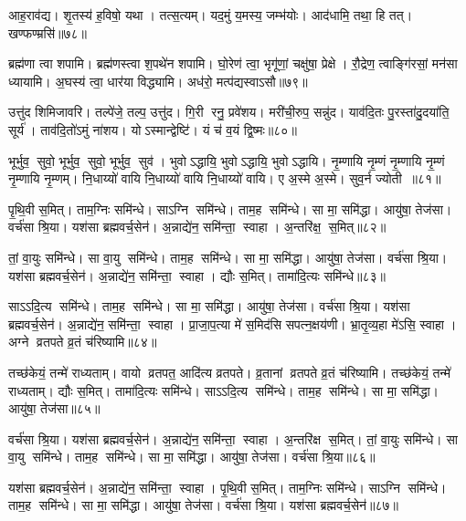 आह॒राव॑द्य। शृ॒तस्य॑ ह॒विषो॒ यथा। तत्स॒त्यम्। यद॒मुं य॒मस्य॒ जम्भ॑योः। आद॑धामि॒ तथा॒ हि तत्। खण्फण्म्रसि॑॥७८॥
\anuvakamend


ब्रह्म॑णा त्वा शपामि। ब्रह्म॑णस्त्वा श॒पथे॑न शपामि। घो॒रेण॑ त्वा॒ भृगू॑णां॒ चक्षु॑षा॒ प्रेक्षे। रौ॒द्रेण॒ त्वाङ्गि॑रसां॒ मन॑सा ध्यायामि। अ॒घस्य॑ त्वा॒ धार॑या विद्ध्यामि। अध॑रो॒ मत्प॑द्यस्वाऽसौ॥७९॥
\anuvakamend


उत्तु॑द शिमिजावरि। तल्पे॑जे॒ तल्प॒ उत्तु॑द। गि॒री रनु॒ प्रवे॑शय। मरी॑ची॒रुप॒ सन्नु॑द। याव॑दि॒तः पु॒रस्ता॑दु॒दया॑ति॒ सूर्य॑। ताव॑दि॒तो॑ऽमुं ना॑शय। योऽस्मान्द्वेष्टि॑। यं च॑ व॒यं द्वि॒ष्मः॥८०॥
\anuvakamend


भूर्भुव॒ सुवो॒ भूर्भुव॒ सुवो॒ भूर्भुव॒ सुव॑। भुवोऽद्धायि॒ भुवोऽद्धायि॒ भुवोऽद्धायि। नृ॒म्णायि नृ॒म्णं नृ॒म्णायि नृ॒म्णं नृ॒म्णायि नृ॒म्णम्। नि॒धाय्यो॑ वायि नि॒धाय्यो॑ वायि नि॒धाय्यो॑ वायि। ए अ॒स्मे अ॒स्मे। सुव॒र्न ज्योती॥८१॥
\anuvakamend


पृ॒थि॒वी स॒मित्। ताम॒ग्निः समि॑न्धे। साऽग्नि समि॑न्धे। ताम॒ह समि॑न्धे। सा मा॒ समि॑द्धा। आयु॑षा॒ तेज॑सा। वर्च॑सा श्रि॒या। यश॑सा ब्रह्मवर्च॒सेन॑। अ॒न्नाद्ये॑न॒ समि॑न्ता॒ स्वाहा। अ॒न्तरि॑क्ष॒ स॒मित्॥८२॥

तां॒ वा॒युः समि॑न्धे। सा वा॒यु समि॑न्धे। ताम॒ह समि॑न्धे। सा मा॒ समि॑द्धा। आयु॑षा॒ तेज॑सा। वर्च॑सा श्रि॒या। यश॑सा ब्रह्मवर्च॒सेन॑। अ॒न्नाद्ये॑न॒ समि॑न्ता॒ स्वाहा। द्यौः स॒मित्। तामा॑दि॒त्यः समि॑न्धे॥८३॥

साऽऽदि॒त्य समि॑न्धे। ताम॒ह समि॑न्धे। सा मा॒ समि॑द्धा। आयु॑षा॒ तेज॑सा। वर्च॑सा श्रि॒या। यश॑सा ब्रह्मवर्च॒सेन॑। अ॒न्नाद्ये॑न॒ समि॑न्ता॒ स्वाहा। प्रा॒जा॒प॒त्या मे॑ स॒मिद॑सि सपत्न॒क्षय॑णी। भ्रा॒तृ॒व्य॒हा मे॑ऽसि॒ स्वाहा। अग्ने व्रतपते व्र॒तं च॑रिष्यामि॥८४॥

तच्छ॑केयं॒ तन्मे॑ राध्यताम्। वायो व्रतपत॒ आदि॑त्य व्रतपते। व्र॒तानां व्रतपते व्र॒तं च॑रिष्यामि। तच्छ॑केयं॒ तन्मे॑ राध्यताम्। द्यौः स॒मित्। तामा॑दि॒त्यः समि॑न्धे। साऽऽदि॒त्य समि॑न्धे। ताम॒ह समि॑न्धे। सा मा॒ समि॑द्धा। आयु॑षा॒ तेज॑सा॥८५॥

वर्च॑सा श्रि॒या। यश॑सा ब्रह्मवर्च॒सेन॑। अ॒न्नाद्ये॑न॒ समि॑न्ता॒ स्वाहा। अ॒न्तरि॑क्ष स॒मित्। तां॒ वा॒युः समि॑न्धे। सा वा॒यु समि॑न्धे। ताम॒ह समि॑न्धे। सा मा॒ समि॑द्धा। आयु॑षा॒ तेज॑सा। वर्च॑सा श्रि॒या॥८६॥

यश॑सा ब्रह्मवर्च॒सेन॑। अ॒न्नाद्ये॑न॒ समि॑न्ता॒ स्वाहा। पृ॒थि॒वी स॒मित्। ताम॒ग्निः समि॑न्धे। साऽग्नि समि॑न्धे। ताम॒ह समि॑न्धे। सा मा॒ समि॑द्धा। आयु॑षा॒ तेज॑सा। वर्च॑सा श्रि॒या। यश॑सा ब्रह्मवर्च॒सेन॑॥८७॥

